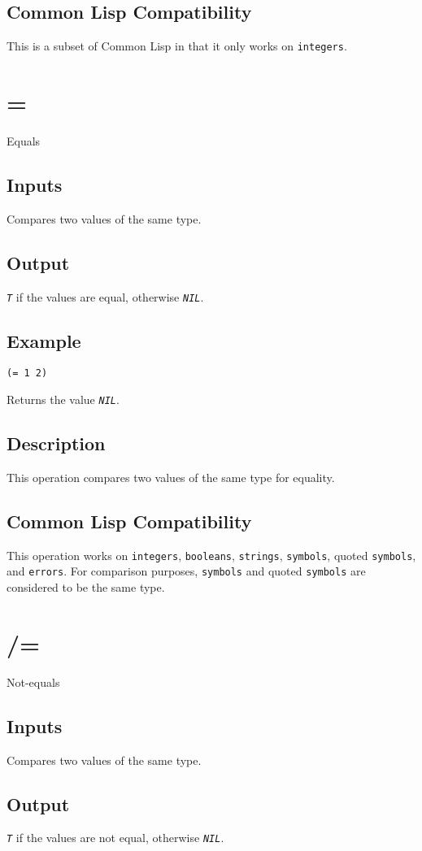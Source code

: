 \documentclass[10pt, openany]{book}
\newcommand{\constant}[1]{\emph{\texttt{#1}}}
\newcommand{\datatype}[1]{\texttt{#1}}
\newcommand{\cl}{Common Lisp}
\begin{document}
\subsection{Common Lisp Compatibility}
This is a subset of \cl{} in that it only works on \datatype{integers}.

\section{=}
Equals
\subsection{Inputs}
Compares two values of the same type.
\subsection{Output}
\constant{T} if the values are equal, otherwise \constant{NIL}.
\subsection{Example}
\begin{lstlisting}
(= 1 2)
\end{lstlisting}
Returns the value \constant{NIL}.
\subsection{Description}
This operation compares two values of the same type for equality.
\subsection{Common Lisp Compatibility}
This operation works on \datatype{integers}, \datatype{booleans}, \datatype{strings}, \datatype{symbols}, quoted \datatype{symbols}, and \datatype{errors}.  For comparison purposes, \datatype{symbols} and quoted \datatype{symbols} are considered to be the same type.

\section{/=}
Not-equals
\subsection{Inputs}
Compares two values of the same type.
\subsection{Output}
\constant{T} if the values are not equal, otherwise \constant{NIL}.
\end{document}
